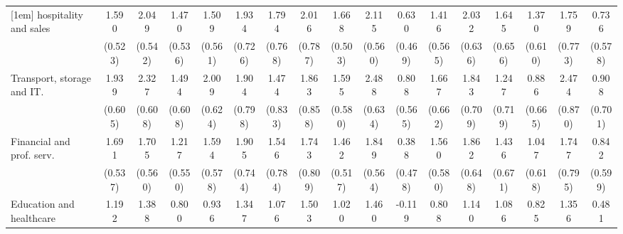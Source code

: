 {\begin{tabular}{l*{16}{c}}
[1em]
hospitality and sales&       1.590\sym{**} &       2.049\sym{***}&       1.470\sym{**} &       1.509\sym{**} &       1.934\sym{**} &       1.794\sym{*}  &       2.016\sym{*}  &       1.668\sym{***}&       2.115\sym{***}&       0.630         &       1.416\sym{*}  &       2.032\sym{**} &       1.645\sym{*}  &       1.370\sym{*}  &       1.759\sym{*}  &       0.736         \\
                    &     (0.523)         &     (0.542)         &     (0.536)         &     (0.561)         &     (0.726)         &     (0.768)         &     (0.787)         &     (0.503)         &     (0.560)         &     (0.469)         &     (0.565)         &     (0.636)         &     (0.656)         &     (0.610)         &     (0.773)         &     (0.578)         \\
[1em]
Transport, storage and IT.&       1.939\sym{**} &       2.327\sym{***}&       1.494\sym{*}  &       2.009\sym{**} &       1.904\sym{*}  &       1.474         &       1.863\sym{*}  &       1.595\sym{**} &       2.488\sym{***}&       0.808         &       1.667\sym{*}  &       1.843\sym{**} &       1.247         &       0.886         &       2.474\sym{**} &       0.908         \\
                    &     (0.605)         &     (0.608)         &     (0.608)         &     (0.624)         &     (0.798)         &     (0.833)         &     (0.858)         &     (0.580)         &     (0.634)         &     (0.565)         &     (0.662)         &     (0.709)         &     (0.719)         &     (0.665)         &     (0.870)         &     (0.701)         \\
[1em]
Financial and prof. serv.&       1.691\sym{**} &       1.705\sym{**} &       1.217\sym{*}  &       1.594\sym{**} &       1.905\sym{*}  &       1.546\sym{*}  &       1.743\sym{*}  &       1.462\sym{**} &       1.849\sym{**} &       0.388         &       1.560\sym{**} &       1.862\sym{**} &       1.436\sym{*}  &       1.047         &       1.747\sym{*}  &       0.842         \\
                    &     (0.537)         &     (0.560)         &     (0.550)         &     (0.578)         &     (0.744)         &     (0.784)         &     (0.809)         &     (0.517)         &     (0.564)         &     (0.478)         &     (0.580)         &     (0.648)         &     (0.671)         &     (0.618)         &     (0.795)         &     (0.599)         \\
[1em]
Education and healthcare&       1.192\sym{*}  &       1.388\sym{*}  &       0.800         &       0.936         &       1.347         &       1.076         &       1.503         &       1.020         &       1.460\sym{*}  &      -0.119         &       0.808         &       1.140         &       1.086         &       0.825         &       1.356         &       0.481         \\

\end{tabular}}

